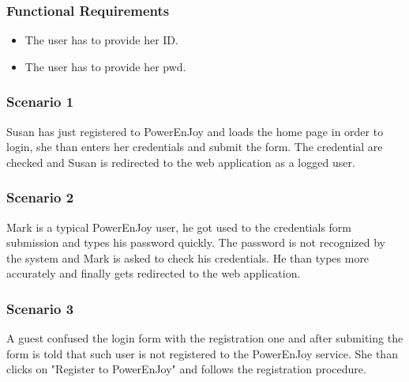 \subsubsection{Functional Requirements}
\begin{itemize}
  \item The user has to provide her \gls{ID}.
  \item The user has to provide her \gls{pwd}.
\end{itemize}

\subsubsection{Scenario 1}
Susan has just registered to PowerEnJoy and loads the home page in order to login, she than enters her credentials and submit the form. The credential are checked and Susan is redirected to the web application as a logged user.

\subsubsection{Scenario 2}
Mark is a typical PowerEnJoy user, he got used to the credentials form submission and types his password quickly. The password is not recognized by the system and Mark is asked to check his credentials. He than types more accurately and finally gets redirected to the web application. %

\subsubsection{Scenario 3}
A guest confused the login form with the registration one and after submiting the form is told that such user is not registered to the PowerEnJoy service. She than clicks on "Register to PowerEnJoy" and follows the registration procedure.

